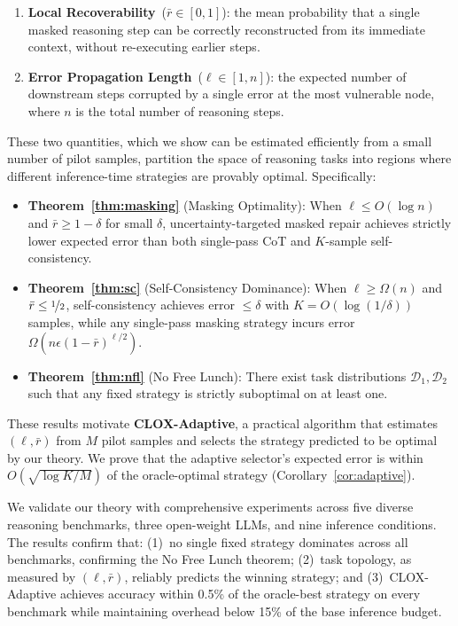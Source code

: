 \documentclass{article}
\begin{document}
\begin{enumerate}[nosep, leftmargin=*]
\item \textbf{Local Recoverability}~($\bar{r} \in [0,1]$): the mean probability that a single masked reasoning step can be correctly reconstructed from its immediate context, without re-executing earlier steps.
\item \textbf{Error Propagation Length}~($\ell \in [1, n]$): the expected number of downstream steps corrupted by a single error at the most vulnerable node, where $n$ is the total number of reasoning steps.
\end{enumerate}

These two quantities, which we show can be estimated efficiently from a small number of pilot samples, partition the space of reasoning tasks into regions where different inference-time strategies are provably optimal. Specifically:

\begin{itemize}[nosep, leftmargin=*]
\item \textbf{Theorem~\ref{thm:masking}} (Masking Optimality): When $\ell \leq O(\log n)$ and $\bar{r} \geq 1 - \delta$ for small $\delta$, uncertainty-targeted masked repair achieves strictly lower expected error than both single-pass CoT and $K$-sample self-consistency.
\item \textbf{Theorem~\ref{thm:sc}} (Self-Consistency Dominance): When $\ell \geq \Omega(n)$ and $\bar{r} \leq \nicefrac{1}{2}$, self-consistency achieves error $\leq \delta$ with $K = O(\log(1/\delta))$ samples, while any single-pass masking strategy incurs error $\Omega(n\epsilon(1-\bar{r})^{\ell/2})$.
\item \textbf{Theorem~\ref{thm:nfl}} (No Free Lunch): There exist task distributions $\mathcal{D}_1, \mathcal{D}_2$ such that any fixed strategy is strictly suboptimal on at least one.
\end{itemize}

These results motivate \textbf{CLOX-Adaptive}, a practical algorithm that estimates $(\ell, \bar{r})$ from $M$ pilot samples and selects the strategy predicted to be optimal by our theory. We prove that the adaptive selector's expected error is within $O(\sqrt{\log K / M})$ of the oracle-optimal strategy (Corollary~\ref{cor:adaptive}).

We validate our theory with comprehensive experiments across five diverse reasoning benchmarks, three open-weight LLMs, and nine inference conditions. The results confirm that: (1)~no single fixed strategy dominates across all benchmarks, confirming the No Free Lunch theorem; (2)~task topology, as measured by $(\ell, \bar{r})$, reliably predicts the winning strategy; and (3)~CLOX-Adaptive achieves accuracy within 0.5\% of the oracle-best strategy on every benchmark while maintaining overhead below 15\% of the base inference budget.
\end{document}

